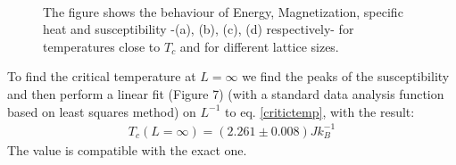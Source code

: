 \documentclass[%
 reprint,
 amsmath,amssymb,
 aps,
]{revtex4-1}
\theoremstyle{plain}
\theoremstyle{definition}
\theoremstyle{plain}
\begin{document}
\begin{figure}
		\label{TransEV}
		\\
		\caption{The figure shows the behaviour of Energy, Magnetization, specific heat and susceptibility -(a), (b), (c), (d) respectively- for temperatures close to $T_c$ and for different lattice sizes.}
\end{figure}

To find the critical temperature at $L=\infty$ we find the peaks of the susceptibility and then perform a linear fit (Figure 7) (with a standard data analysis function based on least squares method) on $L^{-1}$ to eq. \ref{critictemp}, with the result:
\begin{align*}
	T_c(L=\infty) = (2.261\pm0.008)Jk_B^{-1}
\end{align*}
The value is compatible with the exact one.
\end{document}
